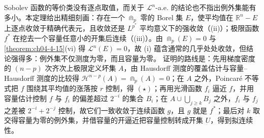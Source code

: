 \documentclass[../../main.tex]{subfiles}%
\begin{document}
\begin{remark}\label{remark:ch04-thm-4-19-动机}
Sobolev 函数的等价类没有逐点取值，而关于 $\mathcal{L}^n$-a.e. 的结论也不指出例外集能有多小。本定理给出精细刻画：存在一个 $\Cap_p$ 零的 Borel 集 $E$，使平均值在 $\mathbb{R}^n-E$ 上逐点收敛于精确代表元，且收敛还是 $L^{p^*}$ 平均意义下的强收敛（(ii)）；极限函数 $f^*$ 在挖去一个容量任意小的开集后连续（(iii)）。由 $\Cap_p(E)=0$ 与\cref{theorem:ch04-4-15}(vi) 得 $\mathcal{L}^n(E)=0$，故 (i) 蕴含通常的几乎处处收敛，但结论强得多：例外集不仅测度为零，而且容量为零。%
证明的路线是：先用梯度密度的 $(n-p)$ 次齐次上极限定义坏集 $A$，由 Hausdorff 测度的覆盖估计与容量--Hausdorff 测度的比较得 $\mathcal{H}^{n-p}(A)=\Cap_p(A)=0$；在 $A$ 之外，Poincaré 不等式把 $f$ 围绕其平均值的涨落按 $r$ 控制，得 $(\star)$；再用光滑函数 $f_i$ 逼近 $f$，并用容量估计控制 $f$ 与 $f_i$ 的偏差超过 $2^{-i}$ 的集合 $B_i$；在 $A\cup\bigcup_{j\geqslant k}B_j$ 之外，$f_i$ 与 $f_j$ 之差被 $2^{-i}+2^{-j}$ 控制，故它们一致收敛于连续函数 $g$，且 $g$ 就是 $f^*$；最后对 $k$ 取交得容量为零的例外集，并借容量的开逼近把容量控制转成开集 $U$，得到拟连续性。
\end{remark}
\end{document}
